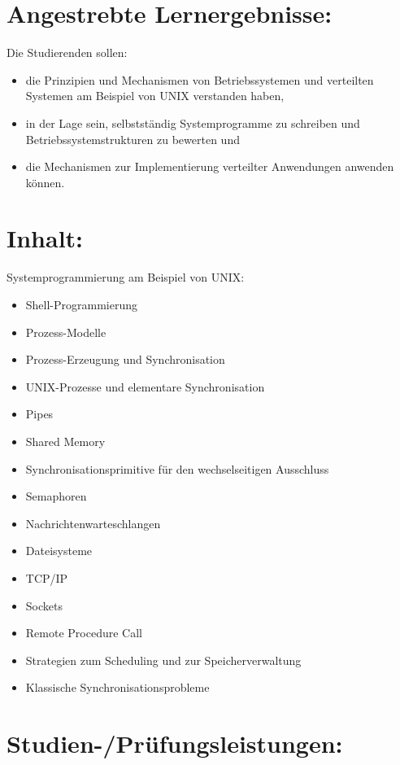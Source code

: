 \section*{Angestrebte
Lernergebnisse:}\label{angestrebte-lernergebnisse-5}

Die Studierenden sollen:

\begin{itemize}
\tightlist
\item
  die Prinzipien und Mechanismen von Betriebssystemen und verteilten
  Systemen am Beispiel von UNIX verstanden haben,
\item
  in der Lage sein, selbstständig Systemprogramme zu schreiben und
  Betriebssystemstrukturen zu bewerten und
\item
  die Mechanismen zur Implementierung verteilter Anwendungen anwenden
  können.
\end{itemize}

\section*{Inhalt:}\label{inhalt-5}

Systemprogrammierung am Beispiel von UNIX:

\begin{itemize}
\tightlist
\item
  Shell-Programmierung
\item
  Prozess-Modelle
\item
  Prozess-Erzeugung und Synchronisation
\item
  UNIX-Prozesse und elementare Synchronisation
\item
  Pipes
\item
  Shared Memory
\item
  Synchronisationsprimitive für den wechselseitigen Ausschluss
\item
  Semaphoren
\item
  Nachrichtenwarteschlangen
\item
  Dateisysteme
\item
  TCP/IP
\item
  Sockets
\item
  Remote Procedure Call
\item
  Strategien zum Scheduling und zur Speicherverwaltung
\item
  Klassische Synchronisationsprobleme
\end{itemize}

\section*{Studien-/Prüfungsleistungen:}\label{studien-pruxfcfungsleistungen-4}


